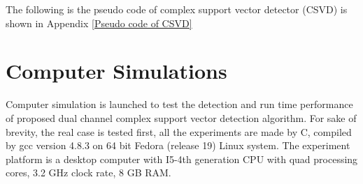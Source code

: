 \documentclass[12pt, draftclsnofoot, onecolumn]{IEEEtran}
\begin{document}
\begin{spacing}{2}
\begin{algorithm}
\begin{algorithmic}
\EndProcedure
\end{algorithmic}
\label{1D2D damping}
\end{algorithm} 

The following is the pseudo code of complex support vector detector (CSVD) is shown in Appendix \ref{Pseudo code of CSVD}


 
\newpage
\section{Computer Simulations}
Computer simulation is launched to test the detection and run time performance of proposed dual channel complex support vector detection algorithm. For sake of brevity, the real case is tested first, all the experiments are made by C, compiled by gcc version 4.8.3 on 64 bit Fedora (release 19) Linux system. The experiment platform is a desktop computer with I5-4th generation CPU with quad processing cores, 3.2 GHz clock rate, 8 GB RAM. 


\end{spacing}
\end{document}
